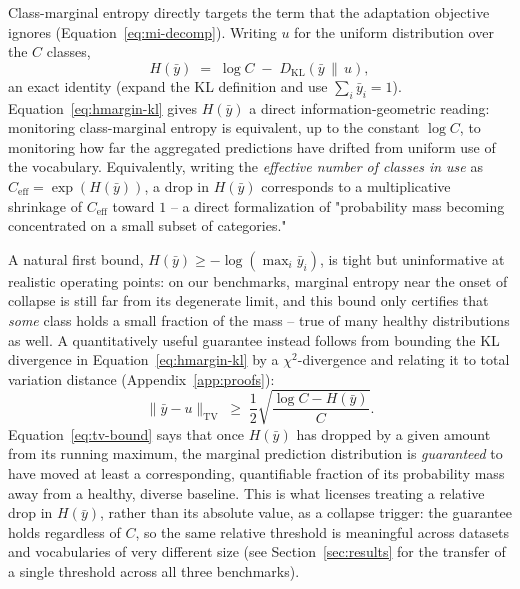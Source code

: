 Class-marginal entropy directly targets the term that the adaptation
objective ignores (Equation~\ref{eq:mi-decomp}). Writing $u$ for the uniform
distribution over the $C$ classes,
\begin{equation}
H(\bar y) \;=\; \log C \;-\; D_{\mathrm{KL}}(\bar y \,\|\, u),
\label{eq:hmargin-kl}
\end{equation}
an exact identity (expand the KL definition and use $\sum_i \bar y_i = 1$).
Equation~\ref{eq:hmargin-kl} gives $H(\bar y)$ a direct information-geometric
reading: monitoring class-marginal entropy is equivalent, up to the constant
$\log C$, to monitoring how far the aggregated predictions have drifted from
uniform use of the vocabulary. Equivalently, writing the \emph{effective
number of classes in use} as $C_{\mathrm{eff}} = \exp(H(\bar y))$, a drop in
$H(\bar y)$ corresponds to a multiplicative shrinkage of $C_{\mathrm{eff}}$
toward $1$ -- a direct formalization of "probability mass becoming
concentrated on a small subset of categories."

A natural first bound, $H(\bar y) \ge -\log(\max_i \bar y_i)$, is tight but
uninformative at realistic operating points: on our benchmarks, marginal
entropy near the onset of collapse is still far from its degenerate limit,
and this bound only certifies that \emph{some} class holds a small fraction
of the mass -- true of many healthy distributions as well. A quantitatively
useful guarantee instead follows from bounding the KL divergence in
Equation~\ref{eq:hmargin-kl} by a $\chi^2$-divergence and relating it to total
variation distance (Appendix~\ref{app:proofs}):
\begin{equation}
\big\| \bar y - u \big\|_{\mathrm{TV}} \;\ge\; \frac12\sqrt{\frac{\log C -
H(\bar y)}{C}}.
\label{eq:tv-bound}
\end{equation}
Equation~\ref{eq:tv-bound} says that once $H(\bar y)$ has dropped by a given
amount from its running maximum, the marginal prediction distribution is
\emph{guaranteed} to have moved at least a corresponding, quantifiable
fraction of its probability mass away from a healthy, diverse baseline. This
is what licenses treating a relative drop in $H(\bar y)$, rather than its
absolute value, as a collapse trigger: the guarantee holds regardless of
$C$, so the same relative threshold is meaningful across datasets and
vocabularies of very different size (see Section~\ref{sec:results} for the
transfer of a single threshold across all three benchmarks).

